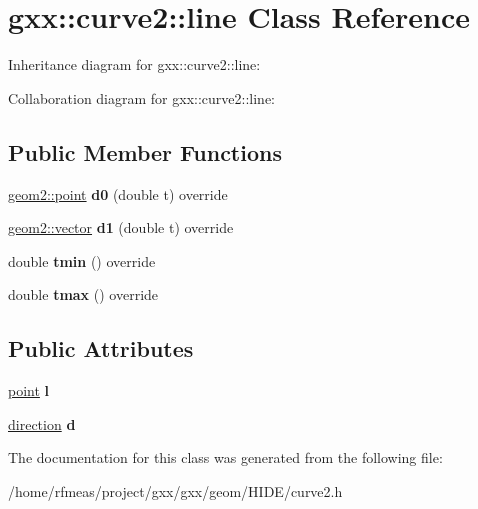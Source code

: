 \hypertarget{classgxx_1_1curve2_1_1line}{}\section{gxx\+:\+:curve2\+:\+:line Class Reference}
\label{classgxx_1_1curve2_1_1line}


Inheritance diagram for gxx\+:\+:curve2\+:\+:line\+:


Collaboration diagram for gxx\+:\+:curve2\+:\+:line\+:
\subsection*{Public Member Functions}
\begin{DoxyCompactItemize}
\item 
\hyperlink{classmalgo_1_1vector2}{geom2\+::point} {\bfseries d0} (double t) override\hypertarget{classgxx_1_1curve2_1_1line_ad0eb33818eed7291d30b1c2c5fff5899}{}\label{classgxx_1_1curve2_1_1line_ad0eb33818eed7291d30b1c2c5fff5899}

\item 
\hyperlink{classmalgo_1_1vector2}{geom2\+::vector} {\bfseries d1} (double t) override\hypertarget{classgxx_1_1curve2_1_1line_a510227cdeed575ea100866926f447ae7}{}\label{classgxx_1_1curve2_1_1line_a510227cdeed575ea100866926f447ae7}

\item 
double {\bfseries tmin} () override\hypertarget{classgxx_1_1curve2_1_1line_ab8c6acdc4d1d0dcc17613cb3e727a881}{}\label{classgxx_1_1curve2_1_1line_ab8c6acdc4d1d0dcc17613cb3e727a881}

\item 
double {\bfseries tmax} () override\hypertarget{classgxx_1_1curve2_1_1line_a54a7c880465ddca9da79d442a0e51584}{}\label{classgxx_1_1curve2_1_1line_a54a7c880465ddca9da79d442a0e51584}

\end{DoxyCompactItemize}
\subsection*{Public Attributes}
\begin{DoxyCompactItemize}
\item 
\hyperlink{classmalgo_1_1vector2}{point} {\bfseries l}\hypertarget{classgxx_1_1curve2_1_1line_a08e5c930365be19f7a8d3c3a1b7a15a8}{}\label{classgxx_1_1curve2_1_1line_a08e5c930365be19f7a8d3c3a1b7a15a8}

\item 
\hyperlink{classmalgo_1_1unit__vector2}{direction} {\bfseries d}\hypertarget{classgxx_1_1curve2_1_1line_ae7ef114ac99584657fb7fc59bd543b36}{}\label{classgxx_1_1curve2_1_1line_ae7ef114ac99584657fb7fc59bd543b36}

\end{DoxyCompactItemize}


The documentation for this class was generated from the following file\+:\begin{DoxyCompactItemize}
\item 
/home/rfmeas/project/gxx/gxx/geom/\+H\+I\+D\+E/curve2.\+h\end{DoxyCompactItemize}
